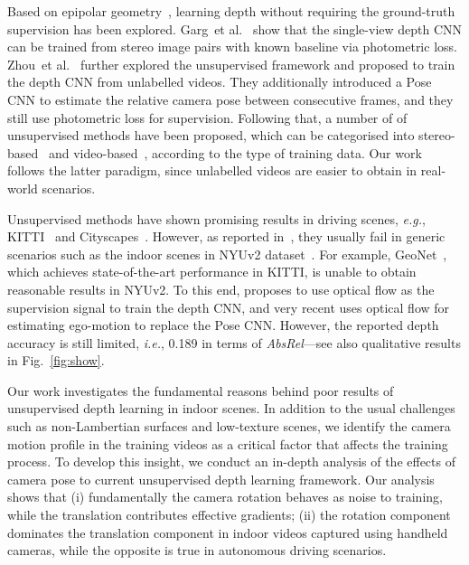 \documentclass{article}
\newcommand{\figref}[1]{Fig.~\ref{#1}}
\def\eg{\emph{e.g.}}
\def\ie{\emph{i.e.}}
\def\etal{et al.}
\begin{document}
Based on epipolar geometry~\cite{Zhang1998,hartley2003multiple,bian2019bench}, learning depth without requiring the ground-truth supervision has been explored.
Garg~\etal~\cite{garg2016unsupervised} show that the single-view depth CNN can be trained from stereo image pairs with known baseline via photometric loss.
Zhou~\etal~\cite{zhou2017unsupervised} further explored the unsupervised framework and proposed to train the depth CNN from unlabelled videos. 
They additionally introduced a Pose CNN to estimate the relative camera pose between consecutive frames, and they still use photometric loss for supervision.
Following that, a number of of unsupervised methods have been proposed, which can be categorised into stereo-based~\cite{godard2017unsupervised, zhan2018unsupervised, zhan2019self, watson2019self} and video-based~\cite{Wang2018CVPR, mahjourian2018unsupervised, yin2018geonet, zou2018df, ranjan2019cc, monodepth2, gordon2019depth, chen2019self, zhou2019unsupervised, bian2019depth}, according to the type of training data.
Our work follows the latter paradigm, since unlabelled videos are easier to obtain in real-world scenarios.

Unsupervised methods have shown promising results in driving scenes, \eg, KITTI~\cite{Geiger2013IJRR} and Cityscapes~\cite{Cordts2016Cityscapes}.
However, as reported in~\cite{Zhou_2019_ICCV}, they usually fail in generic scenarios such as the indoor scenes in NYUv2 dataset~\cite{silberman2012indoor}.
For example, GeoNet~\cite{yin2018geonet}, which achieves state-of-the-art performance in KITTI, is unable to obtain reasonable results in NYUv2.
To this end, \cite{Zhou_2019_ICCV} proposes to use optical flow as the supervision signal to train the depth CNN,
and very recent \cite{zhao2020towards} uses optical flow for estimating ego-motion to replace the Pose CNN.
However, the reported depth accuracy \cite{zhao2020towards} is still limited, \ie, 0.189 in terms of \emph{AbsRel}---see also qualitative results in \figref{fig:show}.

Our work investigates the fundamental reasons behind poor results of unsupervised depth learning in indoor scenes.
In addition to the usual challenges such as non-Lambertian surfaces and low-texture scenes, we identify the camera motion profile in the training videos as a critical factor that affects the training process. To develop this insight, we conduct an in-depth analysis of the effects of camera pose to current unsupervised depth learning framework. Our analysis shows that
(i) fundamentally the camera rotation behaves as noise to training, while the translation contributes effective gradients; (ii) the rotation component dominates the translation component in indoor videos captured using handheld cameras, while the opposite is true in autonomous driving scenarios.
\end{document}

